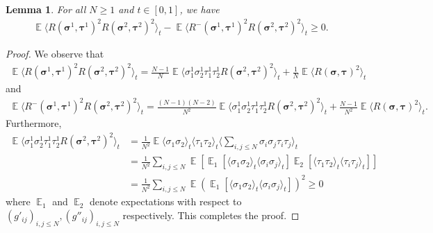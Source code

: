 \documentclass[letterpaper,11pt,reqno]{amsart}
\newtheorem{lem}[thm]{Lemma}
\renewcommand{\le}{\leqslant}
\renewcommand{\geq}{\geqslant}
\newcommand{\ra}{\rangle}
\newcommand{\la}{\langle}
\newcommand{\mvgs}{\boldsymbol{\sigma}}\newcommand{\mvgS}{\boldsymbol{\Sigma}}\newcommand{\mvgt}{\boldsymbol{\tau}}
\DeclareMathOperator{\E}{\mathds{E}}
\begin{document}
\begin{lem}\label{lem:CLT2}
    For all \(N \geq 1\) and \(t \in [0,1]\), we have
    \begin{align*}
        \E \la R(\mvgs^1, \mvgt^1)^2 R(\mvgs^2, \mvgt^2)^2 \ra_{t} - \E \la R^-(\mvgs^1, \mvgt^1)^2 R(\mvgs^2, \mvgt^2)^2 \ra_{t} 
        \geq 0.
    \end{align*}
\end{lem}
\begin{proof}
    We observe that
    \begin{align*}
        \E \la R(\mvgs^1, \mvgt^1)^2 R(\mvgs^2, \mvgt^2)^2 \ra_{t}
        = \frac{N-1}{N} \E \la \sigma^1_1 \sigma^1_2 \tau^1_1 \tau^1_2 R(\mvgs^2, \mvgt^2)^2 \ra_{t} + \frac{1}{N} \E \la R(\mvgs, \mvgt)^2 \ra_{t}
    \end{align*}
    and
    \begin{align*}
        \E \la R^-(\mvgs^1, \mvgt^1)^2 R(\mvgs^2, \mvgt^2)^2 \ra_{t}
        = \frac{(N-1)(N-2)}{N^2} \E \la \sigma^1_1 \sigma^1_2 \tau^1_1 \tau^1_2 R(\mvgs^2, \mvgt^2)^2 \ra_{t} + \frac{N-1}{N^2} \E \la R(\mvgs, \mvgt)^2 \ra_{t}.
    \end{align*}
    Furthermore,
    \begin{align*}
        \E \la \sigma^1_1 \sigma^1_2 \tau^1_1 \tau^1_2 R(\mvgs^2, \mvgt^2)^2 \ra_{t}
        &= \frac{1}{N^2} \E \la \sigma_1 \sigma_2 \ra_t \la \tau_1 \tau_2 \ra_t \la \sum_{i,j \le N} \sigma_i \sigma_j \tau_i \tau_j \ra_{t}\\
        &= \frac{1}{N^2} \sum_{i,j \le N} \E \left[ \E_1 \left[ \la \sigma_1 \sigma_2 \ra_t \la \sigma_i \sigma_j \ra_t \right] \E_2 \left[ \la \tau_1 \tau_2 \ra_t  \la \tau_i \tau_j \ra_{t} \right] \right] \\
        &= \frac{1}{N^2} \sum_{i,j \le N} \E \left( \E_1 \left[ \la \sigma_1 \sigma_2 \ra_t \la \sigma_i \sigma_j \ra_t \right]  \right)^2 \geq 0
    \end{align*}
    where \(\E_1\) and \(\E_2\) denote expectations with respect to \((g'_{ij})_{i,j \le N}, (g''_{ij})_{i,j \le N}\) respectively. This completes the proof.
\end{proof}
\end{document}
